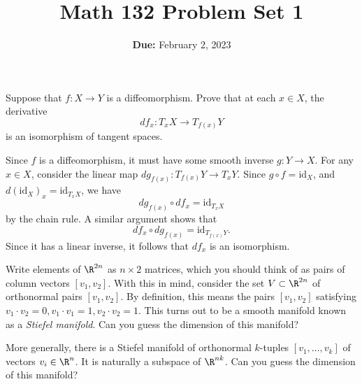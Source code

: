 \documentclass[11pt,letterpaper]{article}
\title{\textbf{Math 132 Problem Set 1}}
\date{\textbf{Due:} February 2, 2023}
\def\id{\mathrm{id}}
\begin{document}
\maketitle

\begin{problem}
    Suppose that $f : X \to Y$ is a diffeomorphism. Prove that at each $x\in X$, the derivative
    \[
        df_x : T_x X \to T_{f(x)}Y
    \]
    is an isomorphism of tangent spaces. 
\end{problem}

\begin{solution}
    \quad Since $f$ is a diffeomorphism, it must have some smooth inverse $g : Y \to X$. For any $x\in X$, consider the linear map $dg_{f(x)} : T_{f(x)} Y \to T_x Y$. Since $g\circ f=\id_X$, and $d(\id_X)_x = \id_{T_x X}$, we have \[dg_{f(x)}\circ df_{x} = \id_{T_x X}\] by the chain rule. A similar argument shows that \[df_{x}\circ dg_{f(x)}=\id_{T_{f(x)} Y}.\] Since it has a linear inverse, it follows that $df_{x}$ is an isomorphism. 
\end{solution}

\begin{problem}
    Write elements of $\R^{2n}$ as $n\times 2$ matrices, which you should think of as pairs of column vectors $[v_1, v_2]$. With this in mind, consider the set $V\subset \R^{2n}$ of orthonormal pairs $[v_1,v_2]$. By definition, this means the pairs $[v_1,v_2]$ satisfying $v_1\cdot v_2=0, v_1\cdot v_1 = 1, v_2\cdot v_2 = 1$. This turns out to be a smooth manifold known as a \emph{Stiefel manifold}. Can you guess the dimension of this manifold?
    \medskip 

    More generally, there is a Stiefel manifold of orthonormal $k$-tuples $[v_1,\ldots,v_k]$ of vectors $v_i\in \R^n$. It is naturally a subspace of $\R^{nk}$. Can you guess the dimension of this manifold? 
\end{problem}
\end{document}
